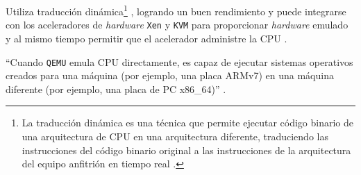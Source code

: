 	
	
	Utiliza 
	traducción dinámica\footnote{
		La traducción dinámica es una técnica que permite ejecutar código binario de una arquitectura de CPU en una arquitectura diferente, traduciendo las instrucciones del código binario original a las instrucciones de la arquitectura del equipo anfitrión en tiempo real \cite{qemu_kvm}.
	}
	, logrando un buen rendimiento y puede integrarse con los aceleradores de \textit{hardware} \texttt{Xen} y \texttt{KVM} para proporcionar \textit{hardware} emulado y al mismo tiempo permitir que el acelerador administre la CPU \cite{qemu_repo}.
	
	
	
	``Cuando \texttt{QEMU} emula CPU directamente, es capaz de ejecutar sistemas operativos creados para una máquina (por ejemplo, una placa ARMv7) en una máquina diferente (por ejemplo, una placa de PC x86\_64)'' \cite{qemu_repo}.
	


	
	
	
	
